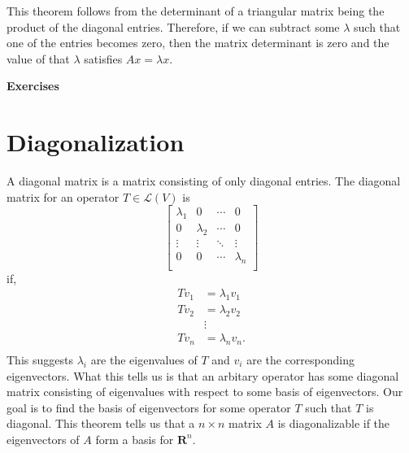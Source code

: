 This theorem follows from the determinant of a triangular matrix being the product of the diagonal entries. Therefore, if we can subtract some $\lambda$ such that one of the entries becomes zero, then the matrix determinant is zero and the value of that $\lambda$ satisfies $Ax = \lambda x$.

\begin{flushleft}
\LARGE \textbf{Exercises} \\
\normalsize
\end{flushleft}

\section{Diagonalization}
\noindent A diagonal matrix is a matrix consisting of only diagonal entries. 
The diagonal matrix for an operator $T \in \mathcal{L}(V)$ is
\[\begin{bmatrix}
    \lambda_1 & 0 & \cdots & 0 \\
    0 & \lambda_2 & \cdots & 0 \\
    \vdots & \vdots & \ddots & \vdots \\
    0 & 0 & \cdots & \lambda_n \\
\end{bmatrix}
\] 
if,
\begin{align*}
    Tv_1 &= \lambda_1v_1 \\
    Tv_2 &= \lambda_2v_2 \\
    &\vdots \\
    Tv_n &= \lambda_nv_n. \\
\end{align*}
This suggests $\lambda_i$ are the eigenvalues of $T$ and $v_i$ are the corresponding eigenvectors.
What this tells us is that an arbitary operator has some diagonal matrix consisting of eigenvalues with respect to some basis of eigenvectors.
Our goal is to find the basis of eigenvectors for some operator $T$ such that $T$ is diagonal.
\noindent This theorem tells us that a $n \times n$ matrix $A$ is diagonalizable if the eigenvectors of $A$ form a basis for $\mathbf{R}^n$.
